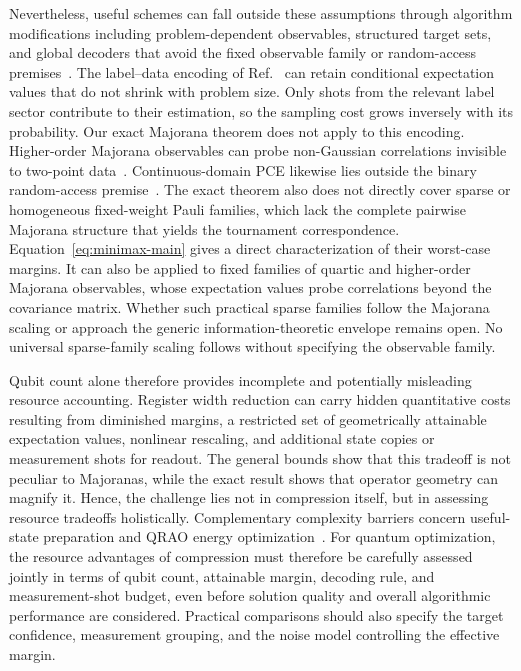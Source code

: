\documentclass[10pt,aps,pra,twocolumn,superscriptaddress,nofootinbib,longbibliography]{revtex4-2}
\begin{document}
Nevertheless, useful schemes can fall outside these assumptions through algorithm modifications including problem-dependent observables, structured target sets, and global decoders that avoid the fixed observable family or random-access premises~\cite{Friedhoff2026ProblemAwarePCE,Suzuki2026DecoderConsistent,MaAngelakis2025InfoMinimal}.  The label--data encoding of Ref.~\cite{SundarDupont2026QubitEfficient} can retain conditional expectation values that do not shrink with problem size.  Only shots from the relevant label sector contribute to their estimation, so the sampling cost grows inversely with its probability.  Our exact Majorana theorem does not apply to this encoding.  Higher-order Majorana observables can probe non-Gaussian correlations invisible to two-point data~\cite{Bravyi2019ManyBody,HastingsODonnell2022,Tarabunga2026NonGaussianity}.  Continuous-domain PCE likewise lies outside the binary random-access premise~\cite{SolovievAdhikari2026Continuous}.  The exact theorem also does not directly cover sparse or homogeneous fixed-weight Pauli families, which lack the complete pairwise Majorana structure that yields the tournament correspondence.  Equation~\eqref{eq:minimax-main} gives a direct characterization of their worst-case margins.  It can also be applied to fixed families of quartic and higher-order Majorana observables, whose expectation values probe correlations beyond the covariance matrix.  Whether such practical sparse families follow the Majorana scaling or approach the generic information-theoretic envelope remains open.  No universal sparse-family scaling follows without specifying the observable family.

Qubit count alone therefore provides incomplete and potentially misleading resource accounting.  Register width reduction can carry hidden quantitative costs resulting from diminished margins, a restricted set of geometrically attainable expectation values, nonlinear rescaling, and additional state copies or measurement shots for readout.  The general bounds show that this tradeoff is not peculiar to Majoranas, while the exact result shows that operator geometry can magnify it.  Hence, the challenge lies not in compression itself, but in assessing resource tradeoffs holistically.  Complementary complexity barriers concern useful-state preparation and QRAO energy optimization~\cite{Hadfield2026StatePreparation,Hadfield2026QRAOComplexity}.  For quantum optimization, the resource advantages of compression must therefore be carefully assessed jointly in terms of qubit count, attainable margin, decoding rule, and measurement-shot budget, even before solution quality and overall algorithmic performance are considered.  Practical comparisons should also specify the target confidence, measurement grouping, and the noise model controlling the effective margin.
\end{document}
